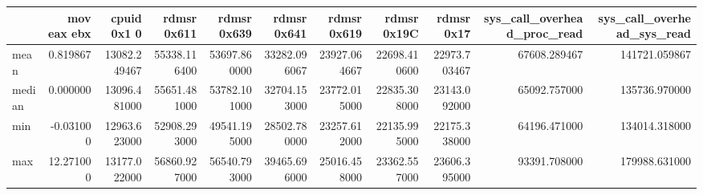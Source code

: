 \begin{tabular}{lrrrrrrrrrr}
\toprule
 & mov eax ebx & cpuid 0x1 0 & rdmsr 0x611 & rdmsr 0x639 & rdmsr 0x641 & rdmsr 0x619 & rdmsr 0x19C & rdmsr 0x17 & sys_call_overhead_proc_read & sys_call_overhead_sys_read \\
\midrule
mean & 0.819867 & 13082.249467 & 55338.116400 & 53697.860000 & 33282.096067 & 23927.064667 & 22698.410600 & 22973.703467 & 67608.289467 & 141721.059867 \\
median & 0.000000 & 13096.481000 & 55651.481000 & 53782.101000 & 32704.153000 & 23772.015000 & 22835.308000 & 23143.092000 & 65092.757000 & 135736.970000 \\
min & -0.031000 & 12963.623000 & 52908.293000 & 49541.195000 & 28502.780000 & 23257.612000 & 22135.995000 & 22175.338000 & 64196.471000 & 134014.318000 \\
max & 12.271000 & 13177.022000 & 56860.927000 & 56540.793000 & 39465.696000 & 25016.458000 & 23362.557000 & 23606.395000 & 93391.708000 & 179988.631000 \\
\bottomrule
\end{tabular}
